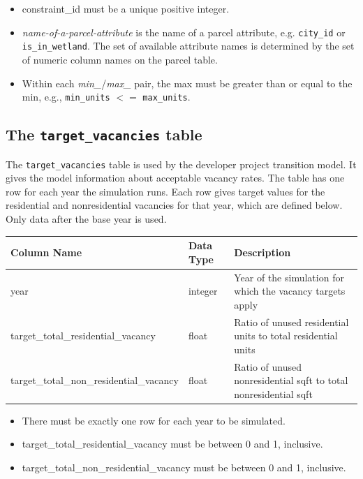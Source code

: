 \begin{itemize}
\tight
\item constraint_id must be a unique positive integer.

\item \emph{name-of-a-parcel-attribute} is the name of a parcel attribute,
e.g. \verb|city_id| or \verb|is_in_wetland|.  The set of available attribute
names is determined by the set of numeric column names on the parcel table.

\item Within each \emph{min_}/\emph{max_} pair, the max must be greater than or
equal to the min, e.g., \verb|min_units| $<=$ \verb|max_units|.

\end{itemize}

\subsection{The {\tt target_vacancies} table}
\label{sec:table-target-vacancies}

The \verb|target_vacancies| table is used by the developer project transition
model. It gives the model information about acceptable vacancy rates. The table
has one row for each year the simulation runs. Each row gives target values for
the residential and nonresidential vacancies for that year, which are defined
below.  Only data after the base year is used.

\begin{tabular}{|l|l|l|}

\hline
\textbf{Column Name} & \textbf{Data Type} & \textbf{Description} \\

\hline year & integer & Year of the simulation for which the vacancy
targets
apply  \\

\hline target_total_residential_vacancy & float & Ratio of unused residential
units to total residential units  \\

\hline target_total_non_residential_vacancy & float & Ratio of unused
nonresidential sqft to total nonresidential sqft  \\

\hline
\end{tabular}

\begin{itemize}
\tight
\item There must be exactly one row for each year to be simulated.
\item target_total_residential_vacancy must be between 0 and 1, inclusive.
\item target_total_non_residential_vacancy must be between 0 and 1, inclusive.
\end{itemize}

